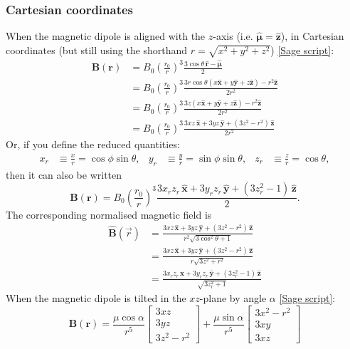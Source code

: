 \documentclass{book}
\newcommand{\unitvec}[1]{\hat{\bm{#1}}}
\newcommand{\linktosage}[1]{\hyperref[#1]{[Sage script]}}
\begin{document}
\subsubsection{Cartesian coordinates}

When the magnetic dipole is aligned with the $z$-axis (i.e. $\unitvec{\mu} = \unitvec{z}$), in Cartesian coordinates (but still using the shorthand $r = \sqrt{x^2 + y^2 + z^2}$) \linktosage{sage:Bdip_aligned}:
\begin{equation}
\begin{aligned}
    \bm{B}(\bm{r})
        &= B_0\left(\frac{r_0}{r}\right)^3\frac{3\cos\theta\,\unitvec{r} - \unitvec{\mu}}{2} \\
        &= B_0\left(\frac{r_0}{r}\right)^3\frac{3r\cos\theta (x\unitvec{x} + y\unitvec{y} + z\unitvec{z}) - r^2\unitvec{z}}{2r^2} \\
        &= B_0\left(\frac{r_0}{r}\right)^3\frac{3z(x\unitvec{x} + y\unitvec{y} + z\unitvec{z}) - r^2\unitvec{z}}{2r^2} \\
        &= B_0\left(\frac{r_0}{r}\right)^3\frac{3xz\,\unitvec{x} + 3yz\,\unitvec{y} + (3z^2 - r^2)\,\unitvec{z}}{2r^2}
\end{aligned}
\end{equation}
Or, if you define the reduced quantities:
\begin{align}
    x_r &\equiv \frac{x}{r} = \cos\phi\sin\theta, &
    y_r &\equiv \frac{y}{r} = \sin\phi\sin\theta, &
    z_r &\equiv \frac{z}{r} = \cos\theta,
\end{align}
then it can also be written
\begin{equation}
    \bm{B}(\bm{r})
        = B_0\left(\frac{r_0}{r}\right)^3\frac{3 x_r z_r \,\unitvec{x} + 3 y_r z_r \,\unitvec{y} + (3 z_r^2 - 1)\,\unitvec{z}}{2}.
\end{equation}
The corresponding normalised magnetic field is
\begin{equation}
\begin{aligned}
    \unitvec{B}(\vec{r})
        &= \frac{3xz\,\unitvec{x} + 3yz\,\unitvec{y} + (3z^2 - r^2)\,\unitvec{z}}{r^2\sqrt{3\cos^2\theta + 1}} \\
        &= \frac{3xz\,\unitvec{x} + 3yz\,\unitvec{y} + (3z^2 - r^2)\,\unitvec{z}}{r\sqrt{3z^2 + r^2}} \\
        &= \frac{3 x_r z_r \, \unitvec{x} + 3 y_r z_r \,\unitvec{y} + (3 z_r^2 - 1)\,\unitvec{z}}{\sqrt{3z_r^2 + 1}}
\end{aligned}
\end{equation}
When the magnetic dipole is tilted in the $xz$-plane by angle $\alpha$ \linktosage{sage:Bdip_inclined}:
\begin{equation}
    \bm{B}(\bm{r}) =
    \frac{\mu\cos\alpha}{r^5}\begin{bmatrix}
        3xz \\
        3yz \\
        3z^2 - r^2
    \end{bmatrix} + 
    \frac{\mu\sin\alpha}{r^5}\begin{bmatrix}
        3x^2 - r^2 \\
        3xy \\
        3xz
    \end{bmatrix}
\end{equation}
\end{document}
